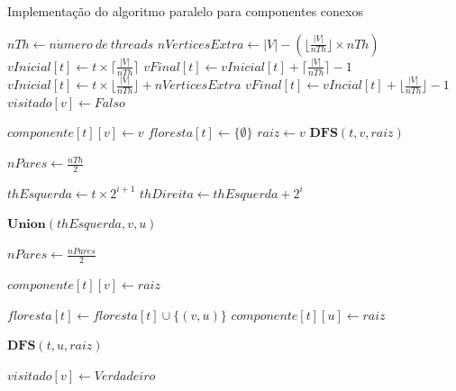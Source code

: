 \documentclass[12pt]{article}
\begin{document}
\begin{algorithm}[h]
    \DontPrintSemicolon
    \caption{Implementação do algoritmo paralelo para componentes conexos}
    {
        $nTh \gets n\acute{u}mero\ de\ threads$\;
        $nVerticesExtra \gets |V| - (\lfloor \frac{|V|}{nTh} \rfloor \times nTh)$\;
        {
            {
                $vInicial[t] \gets t \times \lceil \frac{|V|}{nTh} \rceil$\;
                $vFinal[t] \gets vInicial[t] + \lceil \frac{|V|}{nTh} \rceil - 1$\;
            }
           {
                $vInicial[t] \gets t \times \lfloor \frac{|V|}{nTh} \rfloor + nVerticesExtra$\;
                $vFinal[t] \gets vIncial[t] + \lfloor \frac{|V|}{nTh} \rfloor - 1$\;
            }
        }
        {
            $visitado[v] \gets F\!also$\;
        }
        {
        
            {
                $componente[t][v] \gets v$\;
            }
            $floresta[t] \gets \{\emptyset\}$\;
            {
                {
                    $raiz \gets v$\;
                    $\textbf{DFS}(t,v,raiz)$\;
                }
            }
        }
        $nPares \gets \frac{nTh}{2}$\;
        {
            {
                $thEsquerda \gets t \times 2^{i+1}$\;
                $thDireita \gets thEsquerda + 2^i$\;
                
                {
                    $\textbf{Union}(thEsquerda,v,u)$\;
                }
            }
            $nPares \gets \frac{nPares}{2}$\;
        }
    }
    {
        $componente[t][v] \gets raiz$\;
        
        {
            $floresta[t] \gets floresta[t] \cup \{(v,u)\}$\;
            $componente[t][u] \gets raiz$\;
            
            {
                {
                    $\textbf{DFS}(t,u,raiz)$\;
                }
            }
        }
        $visitado[v] \gets V\!erdadeiro$\;
    }
\end{algorithm}
    
\end{document}

